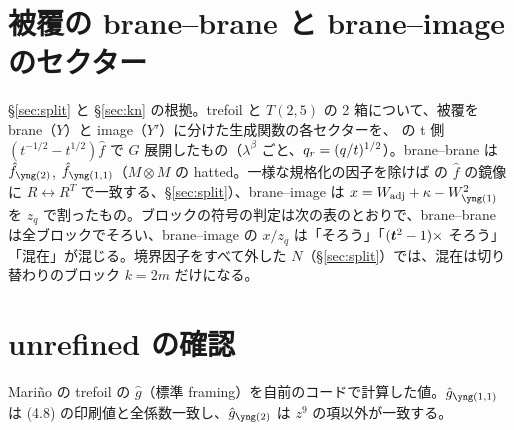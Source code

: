 \section{被覆の brane--brane と brane--image のセクター}\label{app:cover}
§\ref{sec:split} と §\ref{sec:kn} の根拠。trefoil と $T(2,5)$ の 2 箱について、被覆を brane（$Y$）と image（$Y'$）に分けた生成関数の各セクターを、\cite{KN17} の t 側 $(t^{-1/2} - t^{1/2})\hat f$ で $G$ 展開したもの（$\lambda^\beta$ ごと、$q_r = (q/t)^{1/2}$）。brane--brane は $\hat f_{\ytwo}$, $\hat f_{\yoneone}$（$M \otimes M$ の hatted。一様な規格化の因子を除けば \cite{KN17} の $\hat f$ の鏡像に $R \leftrightarrow R^T$ で一致する、§\ref{sec:split}）、brane--image は $x = W_{\mathrm{adj}} + \kappa - W_{\yone}^2$ を $z_q$ で割ったもの。ブロックの符号の判定は次の表のとおりで、brane--brane は全ブロックでそろい、brane--image の $x/z_q$ は「そろう」「$(\bm{t}^2 - 1)\times$ そろう」「混在」が混じる。境界因子をすべて外した $N$（§\ref{sec:split}）では、混在は切り替わりのブロック $k = 2m$ だけになる。



\section{unrefined の確認}\label{app:unref}
Mariño の trefoil の $\hat g$（標準 framing）を自前のコードで計算した値。$\hat g_{\yoneone}$ は \cite{Marino09} (4.8) の印刷値と全係数一致し、$\hat g_{\ytwo}$ は $z^9$ の項以外が一致する。

